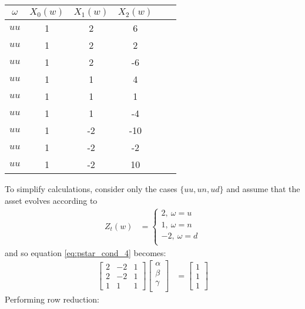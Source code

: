 \documentclass{article}
\begin{document}
\begin{center}
\begin{tabular}{|c|c|c|c|c|c|}
\hline
$\omega$ & $X_0(w)$ & $X_1(w)$ & $X_2(w)$ \\
\hline
\hline
$uu$ & 1 & 2 & 6 \\\hline
$uu$ & 1 & 2 & 2 \\\hline
$uu$ & 1 & 2 & -6 \\\hline
$uu$ & 1 & 1 & 4 \\\hline
$uu$ & 1 & 1 & 1 \\\hline
$uu$ & 1 & 1 & -4 \\\hline
$uu$ & 1 & -2 & -10 \\\hline
$uu$ & 1 & -2 & -2 \\\hline
$uu$ & 1 & -2 & 10 \\\hline
\end{tabular}
\end{center}
To simplify calculations, consider only the cases $\{uu,un,ud\}$ and assume that the asset evolves according to 
\begin{align*}
Z_t(w) &= \begin{cases}
    2, \medspace \omega=u \\
    1, \medspace \omega=n \\
    -2, \medspace \omega=d \\
\end{cases}
\end{align*}
and so equation \ref{eq:pstar_cond_4} becomes:
\begin{align}
\left[\begin{array}{cccc}
2 & -2 & 1\\
2 & -2 & 1\\
1 & 1 & 1
\end{array} \right]
\left[\begin{array}{c}
\alpha\\
\beta\\
\gamma\\
\end{array} \right] &= \left[\begin{array}{c}
1\\
1\\
1
\end{array} \right]
\end{align}
Performing row reduction:
\end{document}
